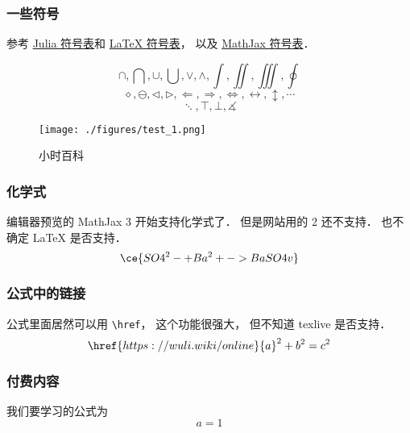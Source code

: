 
\subsubsection{一些符号}
参考 \href{https://docs.julialang.org/en/v1/manual/unicode-input/}{Julia 符号表}和 \href{https://oeis.org/wiki/List_of_LaTeX_mathematical_symbols}{LaTeX 符号表}， 以及 \href{http://www.onemathematicalcat.org/MathJaxDocumentation/TeXSyntax.htm}{MathJax 符号表}．

\begin{equation}
\cap, \bigcap, \cup, \bigcup, \vee, \wedge, \int, \iint, \iiint, \oint
\end{equation}
\begin{equation}
\diamond, \ominus, \triangleleft, \triangleright, \Longleftarrow, \Longrightarrow, \iff, \leftrightarrow, \updownarrow, \cdots
\end{equation}
\begin{equation}
\ddots, \top, \bot, \measuredangle
\end{equation}

\begin{figure}[ht]
\centering
\texttt{[image: ./figures/test\_1.png]}
\caption{小时百科} \label{test_fig1}
\end{figure}

\subsubsection{化学式}
编辑器预览的 MathJax 3 开始支持化学式了． 但是网站用的 2 还不支持． 也不确定 LaTeX 是否支持．
\begin{equation}
\ce{SO4^2- + Ba^2+ -> BaSO4 v}
\end{equation}

\subsubsection{公式中的链接}
公式里面居然可以用 \verb|\href|， 这个功能很强大， 但不知道 texlive 是否支持．
\begin{equation}
\href{https://wuli.wiki/online}{a}^2 + b^2 = c^2
\end{equation}

\subsubsection{付费内容}
我们要学习的公式为
\begin{equation}\label{test_eq1}
a = 1
\end{equation}

